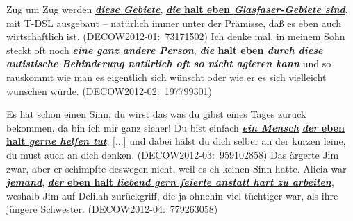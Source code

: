 \begin{exe}
	\ex\label{749} 
		\begin{xlist}	
		\ex\label{749a} 
		\scriptsize
		Zug um Zug werden \underline{\textbf{\textit{diese Gebiete}}}, \underline{\textbf{\textit{die} halt eben 						\textit{Glasfaser-Gebiete sind}}}, mit T-DSL ausgebaut – natürlich immer unter der Prämisse, daß es eben auch 					wirtschaftlich ist.
		\newline		
	 	\hbox{}\hfill\hbox{(DECOW2012-01: 73171502)}
	 	\newline
	 	\hbox{}\hfill\hbox{\citet[168]{Mueller2016a}}
	 	\ex\label{749b} 
	 	\scriptsize
	 	Ich denke mal, in meinem Sohn steckt oft noch \underline{\textbf{\textit{eine ganz andere Person}}}, 							\textbf{\textbf{\textit{die}} halt eben \textit{\textbf{durch diese autistische Behinderung natürlich oft so nicht 				agieren kann}}} und so rauskommt wie man es eigentlich sich wünscht oder wie er es sich vielleicht wünschen würde. 
		\newline		
	 	\hbox{}\hfill\hbox{(DECOW2012-02: 197799301)}
		\end{xlist}
\end{exe}

\begin{exe}
	\ex\label{750} 
		\begin{xlist}	
		\ex\label{750a} 
		\scriptsize
		Es hat schon einen Sinn, du wirst das was du gibst eines Tages zurück bekommen, da bin ich
	 	mir ganz sicher! Du bist einfach \underline{\textbf{\textit{ein Mensch}}} \underline{\textbf{\textit{der} eben halt 			\textit{gerne helfen tut}}}, $[$...$]$ und dabei hälst du dich selber an der kurzen leine, du must auch an dich denken.	
	 	\hfill\hbox{(DECOW2012-03: 959102858)}
	 	\newline
	 	\hbox{}\hfill\hbox{\citet[168]{Mueller2016a}}
	 	\ex\label{750b} 
	 	\scriptsize
	 	Das ärgerte Jim zwar, aber er schimpfte deswegen nicht, weil es eh keinen Sinn hatte. Alicia war 								\underline{\textbf{\textit{jemand}}}, \underline{\textbf{\textit{der} eben halt \textit{liebend gern feierte anstatt 			hart zu arbeiten}}}, weshalb Jim auf Delilah zurückgriff, die ja ohnehin viel tüchtiger war, als ihre jüngere 					Schwester.
		\newline		
	 	\hbox{}\hfill\hbox{(DECOW2012-04: 779263058)}
		\end{xlist}
\end{exe}								                  


